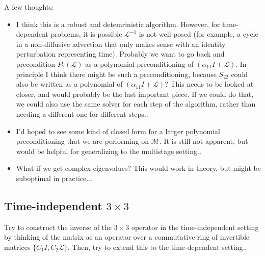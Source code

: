 \documentclass[a4paper,10pt]{article}
\begin{document}
%
{\color{blue}A few thoughts:
\begin{itemize}
\item I think this is a robust and detemrinistic algorithm. However, for time-dependent problems, it is
possible $\mathcal{L}^{-1}$ is not well-posed (for example, a cycle in a non-diffusive advection that
only makes sense with an identity perturbation representing time). Probably we want to go back and
precondition $P_2(\mathcal{L})$ as a polynomial preconditioning of $(\alpha_{11}I+\mathcal{L})$. In
principle I think there might be such a preconditioning, because $S_{22}$ could also be written as
a polynomial of $(\alpha_{11}I+\mathcal{L})$? This needs to be looked at closer, and would probably
be the last important piece. If we could do that, we could also use the same solver for each step of
the algorithm, rather than needing a different one for different steps..

\item I'd hoped to see some kind of closed form for a larger polynomial preconditioning that we
are performing on $\mathcal{M}$. It is still not apparent, but would be helpful for generalizing to
the multistage setting..

\item What if we get complex eigenvalues? This would work in theory, but might be suboptimal in
practice...

\end{itemize}
}
%




\subsection{Time-independent $3\times 3$}

Try to construct the inverse of the $3\times 3$ operator in the time-independent setting by thinking of
the matrix as an operator over a commutative ring of invertible matrices $\{C_1 I, C_2\mathcal{L}\}$. 
Then, try to extend this to the time-dependent setting..
\end{document}
